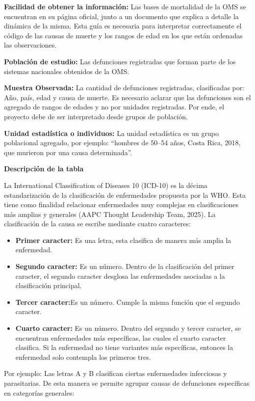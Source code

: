 \documentclass[
  letterpaper,
  DIV=11,
  numbers=noendperiod]{scrartcl}
\begin{document}
\textbf{Facilidad de obtener la información:} Las bases de mortalidad de
la OMS se encuentran en su página oficial, junto a un documento que
explica a detalle la dinámica de la misma. Esta guía es necesaria para
interpretar correctamente el código de las causas de muerte y los rangos
de edad en los que están ordenadas las observaciones.

\textbf{Población de estudio:} Las defunciones registradas que forman
parte de los sistemas nacionales obtenidos\textbar{} de la OMS.

\textbf{Muestra Observada:} La cantidad de defunciones registradas,
clasificadas por: Año, país, edad y causa de muerte. Es necesario
aclarar que las defunciones son el agregado de rangos de edades y no por
unidades registradas. Por ende, el proyecto debe de ser interpretado
desde grupos de población.

\textbf{Unidad estadística o individuos:} La unidad estadística es un
grupo poblacional agregado, por ejemplo: ``hombres de 50--54 años, Costa
Rica, 2018, que murieron por una causa determinada''.

\textbf{Descripción de la tabla}

La International Classification of Diseases 10 (ICD-10) es la décima
estandarización de la clasificación de enfermedades propuesta por la
WHO. Esta tiene como finalidad relacionar enfermedades muy complejas en
clasificaciones más amplias y generales (AAPC Thought Leadership Team,
2025). La clasificación de la causa se escribe mediante cuatro
caracteres:

\begin{itemize}
\item
  \textbf{Primer caracter:} Es una letra, esta clasifica de manera más
  amplia la enfermedad.
\item
  \textbf{Segundo caracter:} Es un número. Dentro de la clasificación
  del primer caracter, el segundo caracter desglosa las enfermedades
  asociadas a la clasificación principal.
\item
  \textbf{Tercer caracter:}Es un número. Cumple la misma función que el
  segundo caracter.
\item
  \textbf{Cuarto caracter:} Es un número. Dentro del segundo y tercer
  caracter, se encuentran enfermedades más específicas, las cuales el
  cuarto caracter clasifica. Si la enfermedad no tiene variantes más
  específicas, entonces la enfermedad solo contempla los primeros tres.
\end{itemize}

Por ejemplo: Las letras A y B clasifican ciertas enfermedades
infecciosas y parasitarias. De esta manera se permite agrupar causas de
defunciones específicas en categorías generales:
\end{document}
